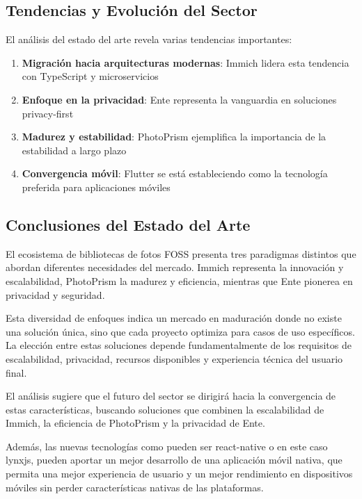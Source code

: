 \subsection{Tendencias y Evolución del Sector}

El análisis del estado del arte revela varias tendencias importantes:

\begin{enumerate}
    \item \textbf{Migración hacia arquitecturas modernas}: Immich lidera esta tendencia con TypeScript y microservicios
    \item \textbf{Enfoque en la privacidad}: Ente representa la vanguardia en soluciones privacy-first
    \item \textbf{Madurez y estabilidad}: PhotoPrism ejemplifica la importancia de la estabilidad a largo plazo
    \item \textbf{Convergencia móvil}: Flutter se está estableciendo como la tecnología preferida para aplicaciones móviles
\end{enumerate}

\subsection{Conclusiones del Estado del Arte}

El ecosistema de bibliotecas de fotos FOSS presenta tres paradigmas distintos que abordan diferentes necesidades del mercado. Immich representa la innovación y escalabilidad, PhotoPrism la madurez y eficiencia, mientras que Ente pionerea en privacidad y seguridad.

Esta diversidad de enfoques indica un mercado en maduración donde no existe una solución única, sino que cada proyecto optimiza para casos de uso específicos. La elección entre estas soluciones depende fundamentalmente de los requisitos de escalabilidad, privacidad, recursos disponibles y experiencia técnica del usuario final.

El análisis sugiere que el futuro del sector se dirigirá hacia la convergencia de estas características, buscando soluciones que combinen la escalabilidad de Immich, la eficiencia de PhotoPrism y la privacidad de Ente.

Además, las nuevas tecnologías como pueden ser \gls{react-native} o en este caso \gls{lynxjs}, pueden aportar un mejor desarrollo de una aplicación móvil nativa, que permita una mejor experiencia de usuario y un mejor rendimiento en dispositivos móviles sin perder características nativas de las plataformas.

